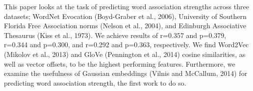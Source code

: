 This paper looks at the task of predicting word association strengths across three datasets; WordNet Evocation (Boyd-Graber et al., 2006), University of Southern Florida Free Association norms (Nelson et al., 2004), and Edinburgh Associative Thesaurus (Kiss et al., 1973). We achieve results of r=0.357 and p=0.379, r=0.344 and p=0.300, and r=0.292 and p=0.363, respectively. We find Word2Vec (Mikolov et al., 2013) and GloVe (Pennington et al., 2014) cosine similarities, as well as vector offsets, to be the highest performing features. Furthermore, we examine the usefulness of Gaussian embeddings (Vilnis and McCallum, 2014) for predicting word association strength, the first work to do so.
